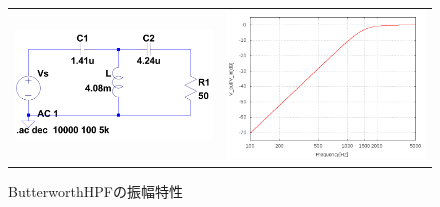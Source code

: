 \documentclass[10pt,a4j,dvipdfmx]{jsarticle}
\begin{document}
 \begin{figure}[H]
     \begin{tabular}{cc}
       \begin{minipage}[t]{0.45\hsize}
         \centering
         \includegraphics[width=8cm]{ButHPF.png}
         \caption{ButterworthHPF($f_c = 1500$)}
       \end{minipage} &
       \begin{minipage}[t]{0.45\hsize}
         \centering
         \includegraphics[width = 8cm]{BHPF_Vgraf.png}
         \caption{ButterworthHPFの振幅特性}
       \end{minipage}
     \end{tabular}
   \end{figure}
\end{document}
